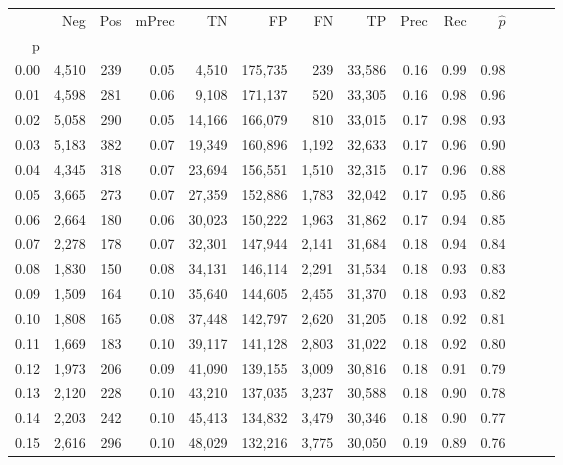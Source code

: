 \begin{tabular}{rrrrrrrrrrrrrr}
\toprule
{} &    Neg &  Pos & mPrec &       TN &       FP &      FN &      TP &  Prec &   Rec & $\hat{p}$ \\
p    &        &      &       &          &          &         &         &       &       &           \\
\midrule
0.00 &  4,510 &  239 &  0.05 &    4,510 &  175,735 &     239 &  33,586 &  0.16 &  0.99 &      0.98 \\
0.01 &  4,598 &  281 &  0.06 &    9,108 &  171,137 &     520 &  33,305 &  0.16 &  0.98 &      0.96 \\
0.02 &  5,058 &  290 &  0.05 &   14,166 &  166,079 &     810 &  33,015 &  0.17 &  0.98 &      0.93 \\
0.03 &  5,183 &  382 &  0.07 &   19,349 &  160,896 &   1,192 &  32,633 &  0.17 &  0.96 &      0.90 \\
0.04 &  4,345 &  318 &  0.07 &   23,694 &  156,551 &   1,510 &  32,315 &  0.17 &  0.96 &      0.88 \\
0.05 &  3,665 &  273 &  0.07 &   27,359 &  152,886 &   1,783 &  32,042 &  0.17 &  0.95 &      0.86 \\
0.06 &  2,664 &  180 &  0.06 &   30,023 &  150,222 &   1,963 &  31,862 &  0.17 &  0.94 &      0.85 \\
0.07 &  2,278 &  178 &  0.07 &   32,301 &  147,944 &   2,141 &  31,684 &  0.18 &  0.94 &      0.84 \\
0.08 &  1,830 &  150 &  0.08 &   34,131 &  146,114 &   2,291 &  31,534 &  0.18 &  0.93 &      0.83 \\
0.09 &  1,509 &  164 &  0.10 &   35,640 &  144,605 &   2,455 &  31,370 &  0.18 &  0.93 &      0.82 \\
0.10 &  1,808 &  165 &  0.08 &   37,448 &  142,797 &   2,620 &  31,205 &  0.18 &  0.92 &      0.81 \\
0.11 &  1,669 &  183 &  0.10 &   39,117 &  141,128 &   2,803 &  31,022 &  0.18 &  0.92 &      0.80 \\
0.12 &  1,973 &  206 &  0.09 &   41,090 &  139,155 &   3,009 &  30,816 &  0.18 &  0.91 &      0.79 \\
0.13 &  2,120 &  228 &  0.10 &   43,210 &  137,035 &   3,237 &  30,588 &  0.18 &  0.90 &      0.78 \\
0.14 &  2,203 &  242 &  0.10 &   45,413 &  134,832 &   3,479 &  30,346 &  0.18 &  0.90 &      0.77 \\
0.15 &  2,616 &  296 &  0.10 &   48,029 &  132,216 &   3,775 &  30,050 &  0.19 &  0.89 &      0.76 \\

\end{tabular}
